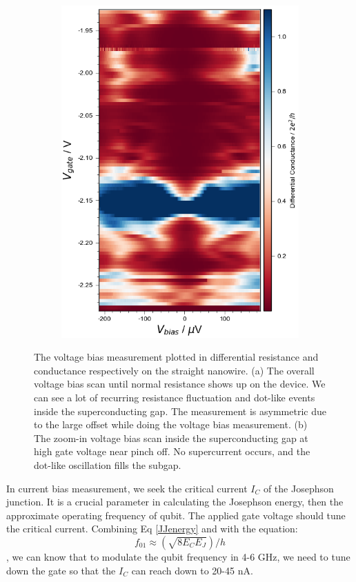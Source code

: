 \begin{figure}[h!]
\begin{subfigure}[b]{0.48\textwidth}
         \includegraphics[width=\textwidth]{Pic/NW2_Vbias_zoom.png}
         \caption{}
         \label{}
     \end{subfigure}
     \caption{The voltage bias measurement plotted in differential resistance and conductance respectively on the straight nanowire. (a) The overall voltage bias scan until normal resistance shows up on the device. We can see a lot of recurring resistance fluctuation and dot-like events inside the superconducting gap. The measurement is asymmetric due to the large offset while doing the voltage bias measurement. (b) The zoom-in voltage bias scan inside the superconducting gap at high gate voltage near pinch off. No supercurrent occurs, and the dot-like oscillation fills the subgap.}
    \label{Ibiasnw2}
\end{figure}
In current bias measurement, we seek the critical current $I_C$ of the Josephson junction. It is a crucial parameter in calculating the Josephson energy, then the approximate operating frequency of qubit. The applied gate voltage should tune the critical current. Combining Eq \ref{JJenergy} and with the equation:
\begin{equation}
    f_{01} \approx (\sqrt{8E_CE_J}) / h
\end{equation}
, we can know that to modulate the qubit frequency in 4-6 GHz, we need to tune down the gate so that the $I_C$ can reach down to 20-45 nA. 

